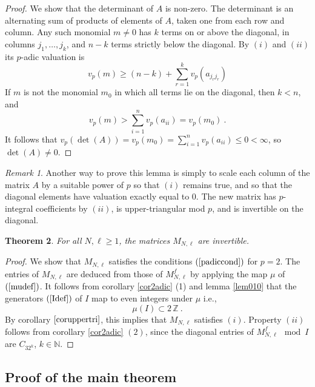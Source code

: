 \documentclass[10pt]{amsart}
\newtheorem{thm}{Theorem}[section]
\theoremstyle{definition}
\theoremstyle{remark}
\newtheorem{rem}[thm]{Remark}
\numberwithin{equation}{section}
\newcommand{\Z}{\mathbb Z}
\newcommand{\N}{\mathbb N}
\begin{document}
\begin{proof} We show that the determinant of $A$ is non-zero. The determinant is an alternating sum of products of elements of $A$, taken one from each row and column.
Any such monomial $m\neq 0$ has $k$ terms  on or  above  the diagonal, in columns $j_1,\ldots, j_k$, and $n-k$ terms strictly below the diagonal.
By $(i)$ and $(ii)$ its $p$-adic valuation is 
$$
v_p(m)  \geq   (n-k) + \sum_{r=1}^k v_p(a_{j_rj_r}) $$
If $m$ is not the monomial $m_0$ in which all terms lie on the diagonal, then $k<n$, and 
$$v_p(m) >   \sum_{i=1}^n v_p(a_{ii}) =v_p(m_0)\ . $$
It follows that $v_p(\det(A)) =  v_p(m_0)=\sum_{i=1}^n v_p(a_{ii}) \leq 0 <\infty$, so $\det(A) \neq 0$.
\end{proof}

\begin{rem} Another way to prove this lemma is simply to scale each column of the matrix $A$ by a suitable power of $p$ so that $(i)$ remains true, and so that the diagonal elements have
valuation exactly equal to $0$. The new  matrix has $p$-integral coefficients by $(ii)$, is upper-triangular mod $p$, and  is invertible on the diagonal.
\end{rem}


\begin{thm} \label{thmlevel1} For all $N, \ell\geq 1$, the matrices $M_{N,\ell}$ are invertible.
\end{thm}

\begin{proof} We show that $M_{N,\ell}$ satisfies the conditions $(\ref{padiccond})$ for $p=2$. The entries of $M_{N,\ell}$ are deduced from those of $M^f_{N,\ell}$ by applying the map $\mu$ of $(\ref{mudef})$. 
It follows from corollary \ref{cor2adic} (1) and lemma \ref{lem010}   that  the generators $(\ref{Idef})$ of $I$ map to even integers under $\mu$ i.e.,
$$\mu(I) \subset 2\, \Z\  .$$
By corollary  $\ref{coruppertri}$, this implies that $M_{N,\ell}$ satisfies $(i)$. Property $(ii)$ follows from  corollary \ref{cor2adic} $(2)$, since the diagonal entries
of $M^f_{N,\ell} \mod I$ are   $C_{32^k}$, $k\in\N$. 
\end{proof}





\subsection{Proof of the main theorem} \label{sectfinalproof}
\end{document}
